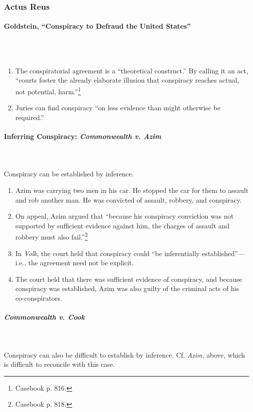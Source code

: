 \subsubsection{Actus Reus}

\paragraph{Goldstein, ``Conspiracy to Defraud the United States''}
~\\\\
\begin{enumerate}
    \item The conspiratorial agreement is a ``theoretical construct.'' By 
    calling it an act, ``courts foster the already elaborate illusion that 
    conspiracy reaches actual, not potential, harm.''\footnote{Casebook p.  
    816.}
    \item Juries can find conspiracy ``on less evidence than might otherwise 
    be required.''
\end{enumerate}

\paragraph{Inferring Conspiracy: \emph{Commonwealth v. Azim}}
~\\\\
Conspiracy can be established by inference.

\begin{enumerate}
    \item Azim was carrying two men in his car. He stopped the car for them to 
    assault and rob another man. He was convicted of assault, robbery, and 
    conspiracy.
    \item On appeal, Azim argued that ``because his conspiracy conviction was 
    not supported by sufficient evidence against him, the charges of assault 
    and robbery must also fail.''\footnote{Casebook p. 818.}
    \item In \emph{Volk}, the court held that conspiracy could ``be 
    inferentially established''---i.e., the agreement need not be explicit.
    \item The court held that there was sufficient evidence of conspiracy, and 
    because conspiracy was established, Azim was also guilty of the criminal
    acts of his co-conspirators.
\end{enumerate}

\paragraph{\emph{Commonwealth v. Cook}}
~\\\\
Conspiracy can also be difficult to establish by inference. Cf. \emph{Azim}, 
above, which is difficult to reconcile with this case.

